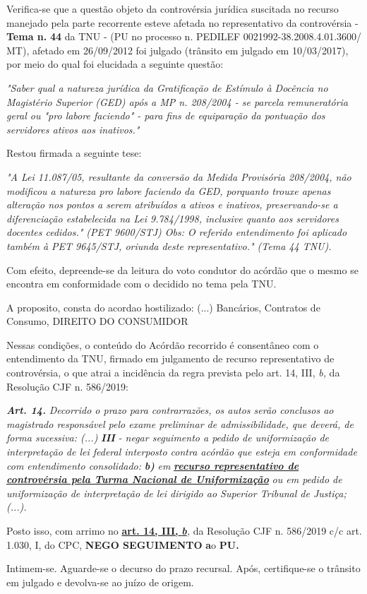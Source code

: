 \documentclass[12pt]{article}
\begin{document}
\justifying
\noindent Verifica-se que a questão objeto da controvérsia jurídica suscitada no recurso manejado pela parte recorrente esteve afetada no representativo da controvérsia - \textbf{Tema n. }\textbf{44} da TNU - (PU no processo n. PEDILEF 0021992-38.2008.4.01.3600/ MT),  afetado em 26/09/2012 foi julgado (trânsito em julgado em 10/03/2017), por meio do qual foi elucidada a seguinte questão:

\noindent \textit{"Saber qual a natureza jurídica da Gratificação de Estímulo à Docência no Magistério Superior (GED) após a MP n. 208/2004 - se parcela remuneratória geral ou "pro labore faciendo" - para fins de equiparação da pontuação dos servidores ativos aos inativos."}

\noindent Restou firmada a seguinte tese:

\noindent \textit{"A Lei 11.087/05, resultante da conversão da Medida Provisória 208/2004, não modificou a natureza pro labore faciendo da GED, porquanto trouxe apenas alteração nos pontos a serem atribuídos a ativos e inativos, preservando-se a diferenciação estabelecida na Lei 9.784/1998, inclusive quanto aos servidores docentes cedidos." (PET 9600/STJ) Obs: O referido entendimento foi aplicado também à PET 9645/STJ, oriunda deste representativo." (Tema 44 TNU).}

\noindent Com efeito, depreende-se da leitura do voto condutor do acórdão que o mesmo se encontra em conformidade com o decidido no  tema pela TNU.

\noindent A proposito, consta do acordao hostilizado: (...) Bancários, Contratos de Consumo, DIREITO DO CONSUMIDOR

\noindent Nessas condições, o conteúdo do Acórdão recorrido é consentâneo com o entendimento da TNU, firmado em julgamento de recurso representativo de controvérsia, o que atrai a incidência da regra prevista pelo art. 14, III, \textit{b,} da Resolução CJF n. 586/2019:

\noindent \textit{\textbf{Art. 14.}}\textit{ Decorrido o prazo para contrarrazões, os autos serão conclusos ao magistrado responsável pelo exame preliminar de admissibilidade, que deverá, de forma sucessiva: (...) }\textit{\textbf{III }}\textit{- negar seguimento a pedido de uniformização de interpretação de lei federal interposto contra acórdão que esteja em conformidade com entendimento consolidado: }\textit{\textbf{b)}}\textit{ em }\uline{\textit{\textbf{recurso representativo de controvérsia pela Turma Nacional de Uniformização}}}\textit{ ou em pedido de uniformização de interpretação de lei dirigido ao Superior Tribunal de Justiça;(...).}

\noindent Posto isso, com arrimo no \uline{\textbf{art. 14, III, }}\uline{\textit{\textbf{b}}}\textit{,} da Resolução CJF n. 586/2019 c/c art. 1.030, I, do CPC, \textbf{NEGO SEGUIMENTO }\textbf{a}o\textbf{ PU}\textbf{.}

\noindent Intimem-se. Aguarde-se o decurso do prazo recursal. Após, certifique-se o trânsito em julgado e devolva-se ao juízo de origem.
\end{document}

